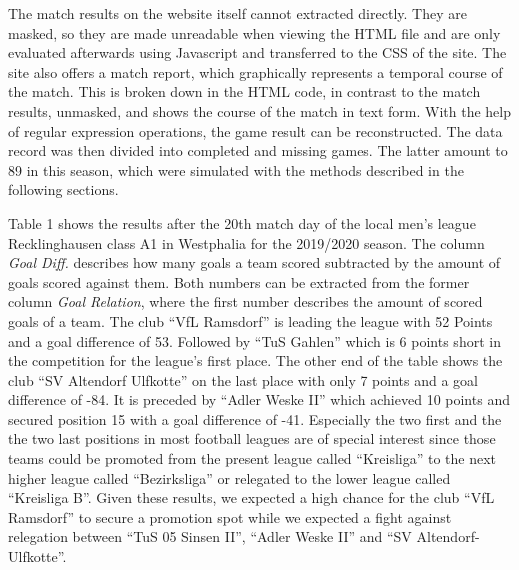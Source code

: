 \documentclass[12pt,a4paper]{article}
\begin{document}
The match results on the website itself cannot extracted directly. They
are masked, so they are made unreadable when viewing the HTML file and
are only evaluated afterwards using Javascript and transferred to the
CSS of the site. The site also offers a match report, which graphically
represents a temporal course of the match. This is broken down in the
HTML code, in contrast to the match results, unmasked, and shows the
course of the match in text form. With the help of regular expression
operations, the game result can be reconstructed. The data record was
then divided into completed and missing games. The latter amount to 89
in this season, which were simulated with the methods described in the
following sections.

Table 1 shows the results after the 20th match day of the local men's
league Recklinghausen class A1 in Westphalia for the 2019/2020 season.
The column \emph{Goal Diff.} describes how many goals a team scored
subtracted by the amount of goals scored against them. Both numbers can
be extracted from the former column \emph{Goal Relation}, where the
first number describes the amount of scored goals of a team. The club
\enquote{VfL Ramsdorf} is leading the league with 52 Points and a goal
difference of 53. Followed by \enquote{TuS Gahlen} which is 6 points
short in the competition for the league's first place. The other end of
the table shows the club \enquote{SV Altendorf Ulfkotte} on the last
place with only 7 points and a goal difference of -84. It is preceded by
\enquote{Adler Weske II} which achieved 10 points and secured position
15 with a goal difference of -41. Especially the two first and the the
two last positions in most football leagues are of special interest
since those teams could be promoted from the present league called
\enquote{Kreisliga} to the next higher league called
\enquote{Bezirksliga} or relegated to the lower league called
\enquote{Kreisliga B}. Given these results, we expected a high chance
for the club \enquote{VfL Ramsdorf} to secure a promotion spot while we
expected a fight against relegation between \enquote{TuS 05 Sinsen II},
\enquote{Adler Weske II} and \enquote{SV Altendorf-Ulfkotte}.
\end{document}
